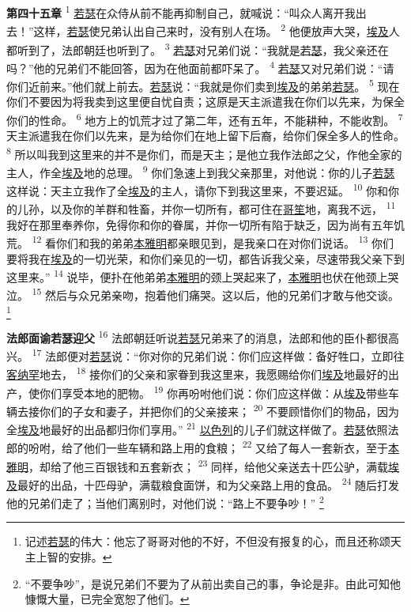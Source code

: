 \textbf{第四十五章\quad}
\textsuperscript{1}
\uline{若瑟}在众侍从前不能再抑制自己，就喊说：“叫众人离开我出去！”这样，\uline{若瑟}使兄弟认出自己来时，没有别人在场。
\textsuperscript{2}
他便放声大哭，\uline{埃及}人都听到了，法郎朝廷也听到了。
\textsuperscript{3}
\uline{若瑟}对兄弟们说：“我就是\uline{若瑟}，我父亲还在吗？”他的兄弟们不能回答，因为在他面前都吓呆了。
\textsuperscript{4}
\uline{若瑟}又对兄弟们说：“请你们近前来。”他们就上前去。\uline{若瑟}说：“我就是你们卖到\uline{埃及}的弟弟\uline{若瑟}。
\textsuperscript{5}
现在你们不要因为将我卖到这里便自忧自责；这原是天主派遣我在你们以先来，为保全你们的性命。
\textsuperscript{6}
地方上的饥荒才过了第二年，还有五年，不能耕种，不能收割。
\textsuperscript{7}
天主派遣我在你们以先来，是为给你们在地上留下后裔，给你们保全多人的性命。
\textsuperscript{8}
所以叫我到这里来的并不是你们，而是天主；是他立我作法郎之父，作他全家的主人，作全\uline{埃及}地的总理。
\textsuperscript{9}
你们急速上到我父亲那里，对他说：你的儿子\uline{若瑟}这样说：天主立我作了全\uline{埃及}的主人，请你下到我这里来，不要迟延。
\textsuperscript{10}
你和你的儿孙，以及你的羊群和牲畜，并你一切所有，都可住在\uline{哥笙}地，离我不远，
\textsuperscript{11}
我好在那里奉养你，免得你和你的眷属，并你一切所有陷于缺乏，因为尚有五年饥荒。
\textsuperscript{12}
看你们和我的弟弟\uline{本雅明}都亲眼见到，是我亲口在对你们说话。
\textsuperscript{13}
你们要将我在\uline{埃及}的一切光荣，和你们亲见的一切，都告诉我父亲，尽速带我父亲下到这里来。”
\textsuperscript{14}
说毕，便扑在他弟弟\uline{本雅明}的颈上哭起来了，\uline{本雅明}也伏在他颈上哭泣。
\textsuperscript{15}
然后与众兄弟亲吻，抱着他们痛哭。这以后，他的兄弟们才敢与他交谈。
\footnote{记述\uline{若瑟}的伟大：他忘了哥哥对他的不好，不但没有报复的心，而且还称颂天主上智的安排。}

\textbf{法郎面谕若瑟迎父\quad}
\textsuperscript{16}
法郎朝廷听说\uline{若瑟}兄弟来了的消息，法郎和他的臣仆都很高兴。
\textsuperscript{17}
法郎便对\uline{若瑟}说：“你对你的兄弟们说：你们应这样做：备好牲口，立即往\uline{客纳罕}地去，
\textsuperscript{18}
接你们的父亲和家眷到我这里来，我愿赐给你们\uline{埃及}地最好的出产，使你们享受本地的肥物。
\textsuperscript{19}
你再吩咐他们说：你们应这样做：从\uline{埃及}带些车辆去接你们的子女和妻子，并把你们的父亲接来；
\textsuperscript{20}
不要顾惜你们的物品，因为全\uline{埃及}地最好的出品都归你们享用。”
\textsuperscript{21}
\uline{以色列}的儿子们就这样做了。\uline{若瑟}依照法郎的吩咐，给了他们一些车辆和路上用的食粮；
\textsuperscript{22}
又给了每人一套新衣，至于\uline{本雅明}，却给了他三百银钱和五套新衣；
\textsuperscript{23}
同样，给他父亲送去十匹公驴，满载\uline{埃及}最好的出品，十匹母驴，满载粮食面饼，和为父亲路上用的食品。
\textsuperscript{24}
随后打发他的兄弟们走了；当他们离别时，对他们说：“路上不要争吵！”
\footnote{“不要争吵”，是说兄弟们不要为了从前出卖自己的事，争论是非。由此可知他慷慨大量，已完全宽恕了他们。}

